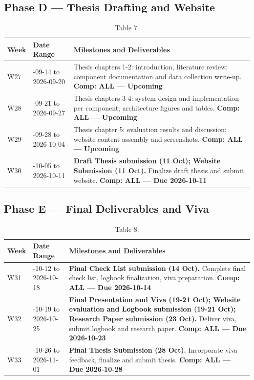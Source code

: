 \documentclass[10pt,journal,onecolumn]{IEEEtran}
\begin{document}
\subsection{Phase D --- Thesis Drafting and Website}

\begin{table}[h]
\caption{Table 7.}
\label{tab:t7}
\begin{tabularx}{\columnwidth}{l >{\raggedright\arraybackslash}X >{\raggedright\arraybackslash}X}
\toprule
\textbf{Week} & \textbf{Date Range} & \textbf{Milestones and Deliverables}\\
\midrule
W27 & 2026-09-14 to 2026-09-20 & Thesis chapters 1-2: introduction, literature review; component documentation and data collection write-up. \textbf{Comp: ALL --- Upcoming}\\
W28 & 2026-09-21 to 2026-09-27 & Thesis chapters 3-4: system design and implementation per component; architecture figures and tables. \textbf{Comp: ALL --- Upcoming}\\
W29 & 2026-09-28 to 2026-10-04 & Thesis chapter 5: evaluation results and discussion; website content assembly and screenshots. \textbf{Comp: ALL --- Upcoming}\\
W30 & 2026-10-05 to 2026-10-11 & \textbf{Draft Thesis submission (11 Oct); Website Submission (11 Oct).} Finalize draft thesis and submit website. \textbf{Comp: ALL --- Due 2026-10-11}\\
\bottomrule
\end{tabularx}
\end{table}

\subsection{Phase E --- Final Deliverables and Viva}

\begin{table}[h]
\caption{Table 8.}
\label{tab:t8}
\begin{tabularx}{\columnwidth}{l >{\raggedright\arraybackslash}X >{\raggedright\arraybackslash}X}
\toprule
\textbf{Week} & \textbf{Date Range} & \textbf{Milestones and Deliverables}\\
\midrule
W31 & 2026-10-12 to 2026-10-18 & \textbf{Final Check List submission (14 Oct).} Complete final check list, logbook finalization, viva preparation. \textbf{Comp: ALL --- Due 2026-10-14}\\
W32 & 2026-10-19 to 2026-10-25 & \textbf{Final Presentation and Viva (19-21 Oct); Website evaluation and Logbook submission (19-21 Oct); Research Paper submission (23 Oct).} Deliver viva, submit logbook and research paper. \textbf{Comp: ALL --- Due 2026-10-23}\\
W33 & 2026-10-26 to 2026-11-01 & \textbf{Final Thesis Submission (28 Oct).} Incorporate viva feedback, finalize and submit thesis. \textbf{Comp: ALL --- Due 2026-10-28}\\
\bottomrule
\end{tabularx}
\end{table}
\end{document}
